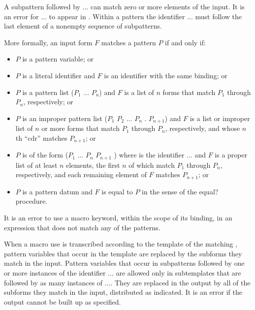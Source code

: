\begin{entry}{%
}

A subpattern followed by {\cf ...} can match zero or more elements of the
input.  It is an error for {\cf ...} to appear in .
Within a pattern the identifier {\cf ...} must follow the last element of
a nonempty sequence of subpatterns.

More formally, an input form $F$ matches a pattern $P$ if and only if:

\begin{itemize}
\item $P$ is a pattern variable; or

\item $P$ is a literal identifier and $F$ is an identifier with the same
      binding; or

\item $P$ is a pattern list {\cf ($P_1$ $\dots$ $P_n$)} and $F$ is a
      list of $n$
      forms that match $P_1$ through $P_n$, respectively; or

\item $P$ is an improper pattern list
      {\cf ($P_1$ $P_2$ $\dots$ $P_n$ . $P_{n+1}$)}
      and $F$ is a list or
      improper list of $n$ or more forms that match $P_1$ through $P_n$,
      respectively, and whose $n$th ``cdr'' matches $P_{n+1}$; or

\item $P$ is %
      of the form
      {\cf ($P_1$ $\dots$ $P_n$ $P_{n+1}$ )}
      where  is the identifier {\cf ...}
      and $F$ is
      a proper list of at least $n$ elements, the first $n$ of which match
      $P_1$ through $P_n$, respectively, and each remaining element of $F$
      matches $P_{n+1}$; or

\item $P$ is a pattern datum and $F$ is equal to $P$ in the sense of
      the {\cf equal?} procedure.
\end{itemize}

It is an error to use a macro keyword, within the scope of its
binding, in an expression that does not match any of the patterns.

When a macro use is transcribed according to the template of the
matching , pattern variables that occur in the
template are replaced by the subforms they match in the input.
Pattern variables that occur in subpatterns followed by one or more
instances of the identifier
{\cf ...} are allowed only in subtemplates that are
followed by as many instances of {\cf ...}.
They are replaced in the
output by all of the subforms they match in the input, distributed as
indicated.  It is an error if the output cannot be built up as
specified.


\end{entry}
